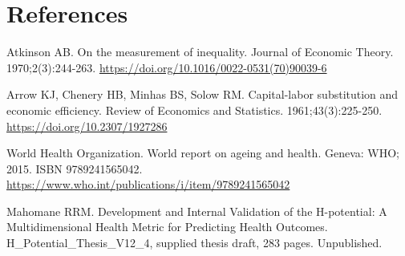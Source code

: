 \documentclass[11pt,a4paper]{article}
\begin{document}
\section*{References}
\begin{list}{}{\setlength{\leftmargin}{2em}\setlength{\itemindent}{-2em}\setlength{\itemsep}{0.3\baselineskip}}\small
\item [1] Atkinson AB. On the measurement of inequality. Journal of Economic Theory. 1970;2(3):244-263. \url{https://doi.org/10.1016/0022-0531(70)90039-6}
\item [2] Arrow KJ, Chenery HB, Minhas BS, Solow RM. Capital-labor substitution and economic efficiency. Review of Economics and Statistics. 1961;43(3):225-250. \url{https://doi.org/10.2307/1927286}
\item [3] World Health Organization. World report on ageing and health. Geneva: WHO; 2015. ISBN 9789241565042. \url{https://www.who.int/publications/i/item/9789241565042}
\item [4] Mahomane RRM. Development and Internal Validation of the H-potential: A Multidimensional Health Metric for Predicting Health Outcomes. H\_Potential\_Thesis\_V12\_4, supplied thesis draft, 283 pages. Unpublished.
\end{list}
\end{document}
